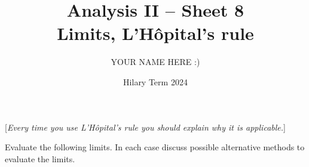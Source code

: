 \documentclass[answers]{exam}
\title{Analysis II -- Sheet 8\\Limits, L'H\^opital's rule}
\author{YOUR NAME HERE :)}
\date{Hilary Term 2024}
\begin{document}
\maketitle

[\emph{Every time you use L'Hôpital's rule you should explain why it is applicable.}]

\begin{questions}

\question%
Evaluate the following limits. In each case discuss possible alternative methods to evaluate the limits.%
\end{questions}
\end{document}
